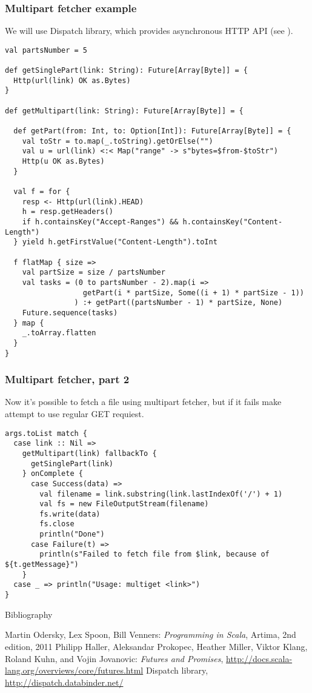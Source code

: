 \documentclass{beamer}
\begin{document}
\begin{frame}[fragile]
\frametitle{Multipart fetcher example}
We will use Dispatch library, which provides asynchronous HTTP API (see \cite{dispatch}).
\begin{lstlisting}[name=multifetch]
val partsNumber = 5

def getSinglePart(link: String): Future[Array[Byte]] = {
  Http(url(link) OK as.Bytes)
}

def getMultipart(link: String): Future[Array[Byte]] = {

  def getPart(from: Int, to: Option[Int]): Future[Array[Byte]] = {
    val toStr = to.map(_.toString).getOrElse("")
    val u = url(link) <:< Map("range" -> s"bytes=$from-$toStr")
    Http(u OK as.Bytes)
  }

  val f = for {
    resp <- Http(url(link).HEAD)
    h = resp.getHeaders()
    if h.containsKey("Accept-Ranges") && h.containsKey("Content-Length")
  } yield h.getFirstValue("Content-Length").toInt

  f flatMap { size =>
    val partSize = size / partsNumber
    val tasks = (0 to partsNumber - 2).map(i =>
                  getPart(i * partSize, Some((i + 1) * partSize - 1))
                ) :+ getPart((partsNumber - 1) * partSize, None)
    Future.sequence(tasks)
  } map {
    _.toArray.flatten
  }
}
\end{lstlisting}
\end{frame}

\begin{frame}[fragile]
\frametitle{Multipart fetcher, part 2}
Now it's possible to fetch a file using multipart fetcher, but if it fails make attempt to use
regular GET requiest.
\begin{lstlisting}[name=multifetch]
args.toList match {
  case link :: Nil =>
    getMultipart(link) fallbackTo {
      getSinglePart(link)
    } onComplete {
      case Success(data) =>
        val filename = link.substring(link.lastIndexOf('/') + 1)
        val fs = new FileOutputStream(filename)
        fs.write(data)
        fs.close
        println("Done")
      case Failure(t) =>
        println(s"Failed to fetch file from $link, because of ${t.getMessage}")
    }
  case _ => println("Usage: multiget <link>")
}
\end{lstlisting}
\end{frame}


\begin{frame}{Bibliography}
\begin{thebibliography}{00}
Martin Odersky, Lex Spoon, Bill Venners:
\emph{Programming in Scala},
Artima, 2nd edition, 2011
Philipp Haller, Aleksandar Prokopec, Heather Miller, Viktor Klang, Roland Kuhn, and Vojin Jovanovic:
\emph{Futures and Promises}, \url{http://docs.scala-lang.org/overviews/core/futures.html}
Dispatch library, \url{http://dispatch.databinder.net/}
\end{thebibliography}
\end{frame}


\end{document}
